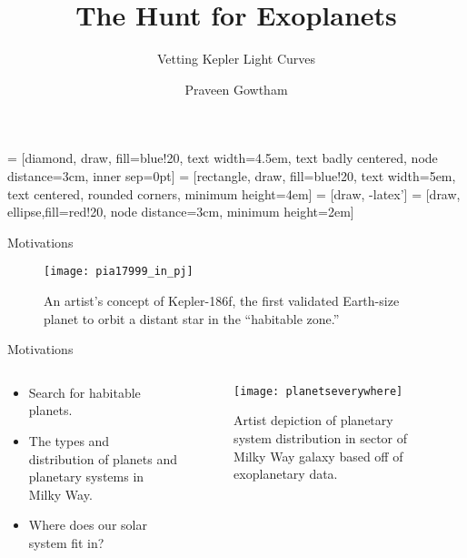 \documentclass{beamer}
\title[Springboard Capstone 2]{The Hunt for Exoplanets}
\subtitle{Vetting Kepler Light Curves}
\author{Praveen Gowtham} %
\institute[UCLA] %
\date{} %
\begin{document}
 = [diamond, draw, fill=blue!20, 
text width=4.5em, text badly centered, node distance=3cm, inner sep=0pt]
 = [rectangle, draw, fill=blue!20, 
text width=5em, text centered, rounded corners, minimum height=4em]
 = [draw, -latex']
 = [draw, ellipse,fill=red!20, node distance=3cm,
minimum height=2em]
	
	\begin{frame}
		\titlepage %
	\end{frame}

\begin{frame}{Motivations}
	\begin{figure}
		\texttt{[image: pia17999\_in\_pj]}
		\caption{An artist’s concept of Kepler-186f, the first validated Earth-size planet to orbit a distant star in the “habitable zone.”}
	\end{figure}


\end{frame}

\begin{frame}{Motivations}
	\begin{columns}
		\begin{column}{0.4\textwidth}
		
		  \begin{itemize}
			\item Search for habitable planets.
			\item The types and distribution of planets and planetary systems in Milky Way.
			\item Where does our solar system fit in?
		\end{itemize}	
		\end{column}
	\begin{column}{0.6\textwidth}
		\begin{figure}
			\texttt{[image: planetseverywhere]}
					\caption{Artist depiction of planetary system distribution in sector of Milky Way galaxy based off of exoplanetary data.}
		\end{figure}

	\end{column}
\end{columns}
\end{frame}
\end{document}

